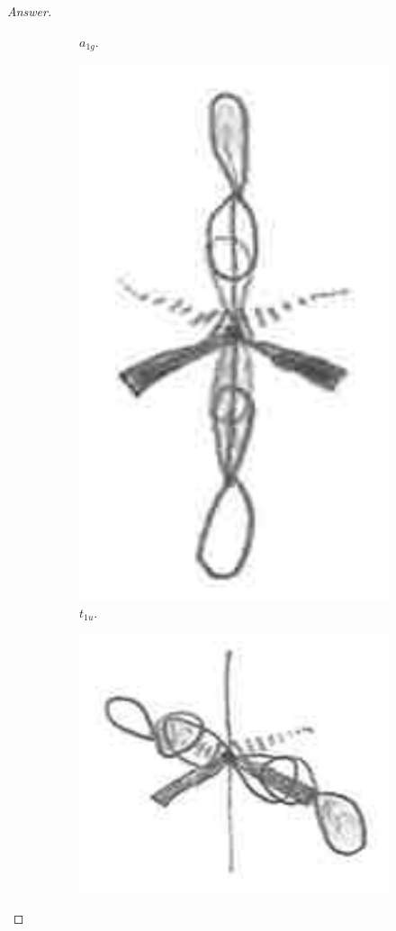 \documentclass[../psets.tex]{subfiles}
\begin{document}
\begin{enumerate}[label={\Roman*)}]
\begin{enumerate}[label={\alph*)}]
\begin{proof}[Answer]
\begin{figure}[H]
\begin{subfigure}[b]{0.24\linewidth}
                    \caption{$a_{1g}$.}
                    \label{fig:SALC-SF6a}
                \end{subfigure}
                \begin{subfigure}[b]{0.24\linewidth}
                    \centering
                    \includegraphics[width=0.5\linewidth]{../ExtFiles/SALC-SF6b.png}
                    \caption{$t_{1u}$.}
                    \label{fig:SALC-SF6b}
                \end{subfigure}
                \begin{subfigure}[b]{0.24\linewidth}
                    \centering
                    \includegraphics[width=0.8\linewidth]{../ExtFiles/SALC-SF6c.png}

\end{subfigure}
\end{figure}
\end{proof}
\end{enumerate}
\end{enumerate}
\end{document}
